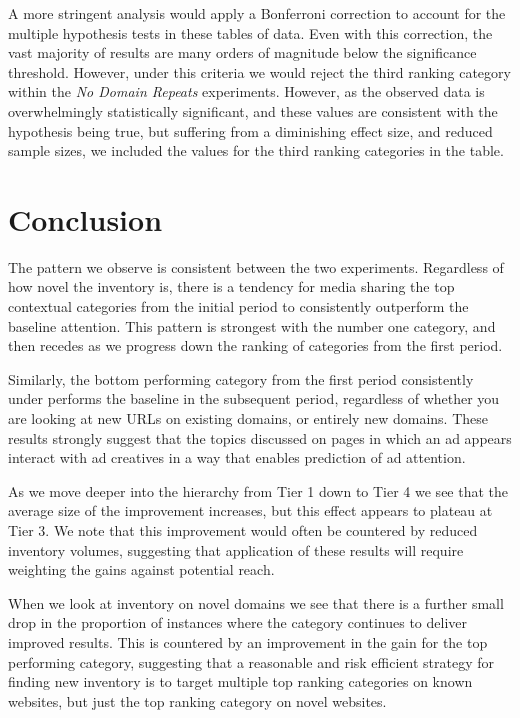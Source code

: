 \documentclass[sigconf]{acmart}
\begin{document}
A more stringent analysis would apply a Bonferroni correction to account for the multiple
hypothesis tests in these tables of data. Even with this correction, the vast majority
of results
are many orders of magnitude below the significance threshold. However, under this criteria
we would reject the third ranking category within the \emph{No Domain Repeats} experiments.
However, as the observed data is overwhelmingly statistically significant, and these values
are consistent with the hypothesis being true, but suffering from a diminishing effect size,
and reduced sample sizes, we included the values for the third ranking categories in the
table.

\section{Conclusion}
The pattern we observe is consistent between the two experiments. Regardless of
how novel the inventory is, there is a tendency for media sharing the top contextual
categories from the
initial period to consistently outperform the baseline attention.
This pattern is strongest with the number one category, and then recedes
as we progress down the ranking of categories from the first period.

Similarly, the bottom performing category from the first period consistently under performs
the baseline in the subsequent period, regardless of whether you are looking at new URLs
on existing domains, or entirely new domains.
These results strongly suggest that the topics discussed on pages in which an ad appears
interact with ad creatives in a way that enables prediction of ad attention.

As we move deeper into the hierarchy from Tier 1 down to Tier 4 we see that the average size
of the improvement increases, but this effect appears to plateau at Tier 3. We note that this
improvement would often be countered by reduced inventory volumes, suggesting that application
of these results will require weighting the gains against potential reach.

When we look at inventory on novel domains we see that there is a further small drop in the
proportion of instances where the category continues to deliver improved results. This is
countered by an improvement in the gain for the top performing category, suggesting that a
reasonable and risk efficient strategy for finding new inventory is to target multiple top
ranking categories on known websites, but just the top ranking category on novel websites.
\end{document}
